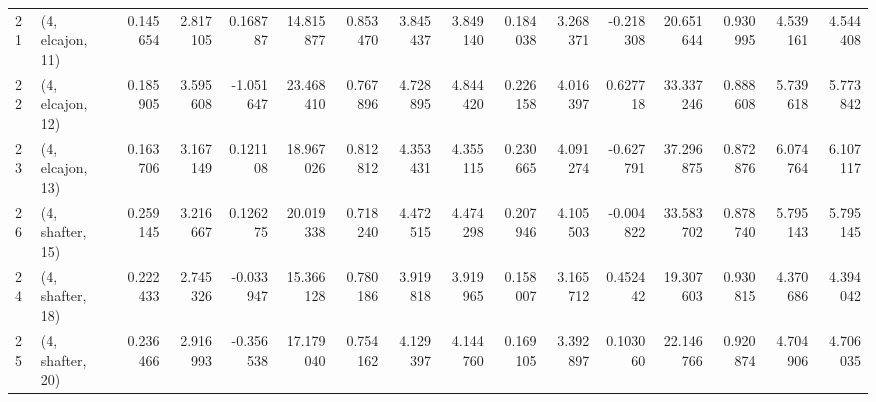 \begin{tabular}{llrrrrrrrrrrrrrr}
21 &  (4, elcajon, 11) &   0.145654 &  2.817105 &  0.168787 &  14.815877 &  0.853470 &   3.845437 &  3.849140 &  0.184038 &  3.268371 & -0.218308 &   20.651644 &  0.930995 &   4.539161 &   4.544408 \\
22 &  (4, elcajon, 12) &   0.185905 &  3.595608 & -1.051647 &  23.468410 &  0.767896 &   4.728895 &  4.844420 &  0.226158 &  4.016397 &  0.627718 &   33.337246 &  0.888608 &   5.739618 &   5.773842 \\
23 &  (4, elcajon, 13) &   0.163706 &  3.167149 &  0.121108 &  18.967026 &  0.812812 &   4.353431 &  4.355115 &  0.230665 &  4.091274 & -0.627791 &   37.296875 &  0.872876 &   6.074764 &   6.107117 \\
26 &  (4, shafter, 15) &   0.259145 &  3.216667 &  0.126275 &  20.019338 &  0.718240 &   4.472515 &  4.474298 &  0.207946 &  4.105503 & -0.004822 &   33.583702 &  0.878740 &   5.795143 &   5.795145 \\
24 &  (4, shafter, 18) &   0.222433 &  2.745326 & -0.033947 &  15.366128 &  0.780186 &   3.919818 &  3.919965 &  0.158007 &  3.165712 &  0.452442 &   19.307603 &  0.930815 &   4.370686 &   4.394042 \\
25 &  (4, shafter, 20) &   0.236466 &  2.916993 & -0.356538 &  17.179040 &  0.754162 &   4.129397 &  4.144760 &  0.169105 &  3.392897 &  0.103060 &   22.146766 &  0.920874 &   4.704906 &   4.706035 \\
\bottomrule
\end{tabular}
